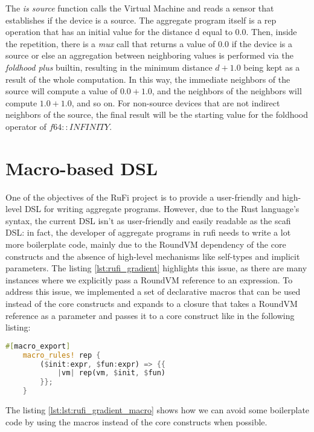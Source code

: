 The \textit{is source} function calls the Virtual Machine and reads a sensor that establishes if the device is a source.
The aggregate program itself is a rep operation that has an initial value for the distance d equal to $0.0$.
Then, inside the repetition, there is a \textit{mux} call that returns a value of $0.0$ if the device is a source or else an aggregation between neighboring values is performed via the \textit{foldhood plus} builtin, resulting in the minimum distance $d + 1.0$ being kept as a result of the whole computation.
In this way, the immediate neighbors of the source will compute a value of $0.0 + 1.0$, and the neighbors of the neighbors will compute $1.0 + 1.0$, and so on.
For non-source devices that are not indirect neighbors of the source, the final result will be the starting value for the foldhood operator of $f64::INFINITY$.

\section{Macro-based DSL}
One of the objectives of the RuFi project is to provide a user-friendly and high-level DSL for writing aggregate programs. However, due to the Rust language's syntax, the current DSL isn't as user-friendly and
easily readable as the \ac{scafi} DSL: in fact, the developer of aggregate programs in \ac{rufi} needs to write a lot more boilerplate code, mainly due to the RoundVM dependency of the core constructs and the absence of high-level 
mechanisms like self-types and implicit parameters.
The listing \ref{lst:rufi_gradient} highlights this issue, as there are many instances where we explicitly pass a RoundVM reference to an expression.
To address this issue, we implemented a set of declarative macros that can be used instead of the core constructs and expands to a closure that takes a RoundVM reference as a parameter and passes it to a core construct like in the following listing:

\begin{lstlisting}[language=Rust]
    #[macro_export]
    macro_rules! rep {
        ($init:expr, $fun:expr) => {{
            |vm| rep(vm, $init, $fun)
        }};
    }
\end{lstlisting}

The listing \ref{lst:lst:rufi_gradient_macro} shows how we can avoid some boilerplate code by using the macros instead of the core constructs when possible.

